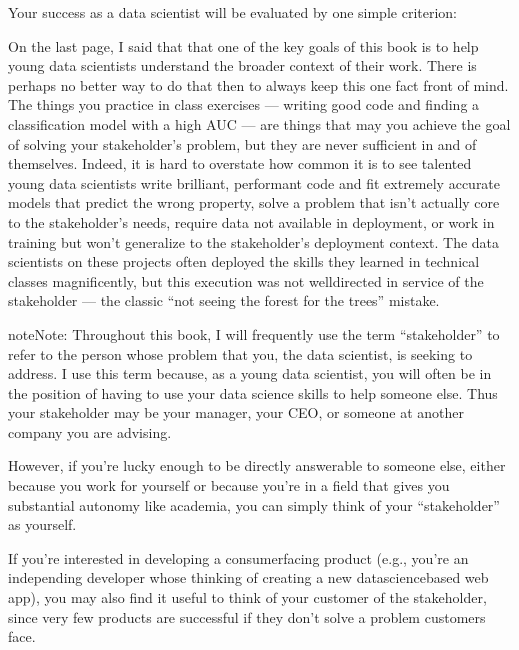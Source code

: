 \documentclass[letterpaper,10pt,english]{jupyterBook}
\begin{document}
\begin{sphinxShadowBox}

\sphinxAtStartPar
Your success as a data scientist will  be evaluated by one simple criterion: 
\end{sphinxShadowBox}

\sphinxAtStartPar
On the last page, I said that that one of the key goals of this book is to help young data scientists understand the broader context of their work. There is perhaps no better way to do that then to always keep this one fact front of mind. The things you practice in class exercises — writing good code and finding a classification model with a high AUC — are things that may  you achieve the goal of solving your stakeholder’s problem, but they are never sufficient in and of themselves. Indeed, it is hard to overstate how common it is to see talented young data scientists write brilliant, performant code and fit extremely accurate models that predict the wrong property, solve a problem that isn’t actually core to the stakeholder’s needs, require data not available in deployment, or work in training but won’t generalize to the stakeholder’s deployment context. The data scientists on these projects often deployed the skills they learned in technical classes magnificently, but this execution was not well\sphinxhyphen{}directed in service of the stakeholder — the classic “not seeing the forest for the trees” mistake.

\begin{sphinxadmonition}{note}{Note:}
\sphinxAtStartPar
Throughout this book, I will frequently use the term “stakeholder” to refer to the person whose problem that you, the data scientist, is seeking to address. I use this term because, as a young data scientist, you will often be in the position of having to use your data science skills to help someone else. Thus your stakeholder may be your manager, your CEO, or someone at another company you are advising.

\sphinxAtStartPar
However, if you’re lucky enough to  be directly answerable to someone else, either because you work for yourself or because you’re in a field that gives you substantial autonomy like academia, you can simply think of your “stakeholder” as yourself.

\sphinxAtStartPar
If you’re interested in developing a consumer\sphinxhyphen{}facing product (e.g., you’re an independing developer whose thinking of creating a new data\sphinxhyphen{}science\sphinxhyphen{}based web app), you may also find it useful to think of your customer of the stakeholder, since very few products are successful if they don’t solve a problem customers face.
\end{sphinxadmonition}
\end{document}
